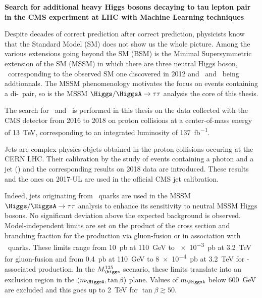 \begin{center}
\LARGE
\bf
\sffamily
Search for additional heavy Higgs bosons decaying to tau lepton pair in the CMS experiment at LHC with Machine Learning techniques
\end{center}

\vspace{2\baselineskip}

Despite decades of correct prediction after correct prediction,
physicists know that the Standard Model (SM) does not show us the whole picture.
Among the various extensions going beyond the SM (BSM)
is the
Minimal Supersymmetric extension of the SM (MSSM)
in which
there are three neutral Higgs boson,
\higgs\ corresponding to the observed SM one discovered in 2012
and
\Higgs\ and \HiggsA\ being addtionnals.
The MSSM phenomenology motivates the focus on events containing a di-\tau\ pair,
so is the MSSM $\Higgs/\HiggsA\to\tau\tau$ analysis the core of this thesis.
\par
The search
for \Higgs\ and \HiggsA\ 
is performed
in this thesis
on the data collected
with the CMS detector from 2016 to 2018
on proton collisions
at a center-of-mass energy of \SI{13}{\TeV},
corresponding to an integrated luminosity of \SI{137}{\femto\barn^{-1}}.
\par
Jets are complex physics objets
obtained
in the proton collisions occuring at the CERN LHC.
Their calibration by
the study of events containing a photon and a jet (\Gjet)
and the corresponding results on 2018 data
are introduced.
These results and the ones on 2017-UL
are used in the official CMS jet calibration.
\par
Indeed,
jets originating from \quarkb~quarks are used in the MSSM $\Higgs/\HiggsA\to\tau\tau$ analysis
to enhance its sensitivity to neutral MSSM Higgs bosons.
No significant deviation above the expected background is observed.
Model-independent limits are set
on the product of the cross section and branching fraction
for the production
via gluon-fusion
or
in association with \quarkb~quarks.
These limits range
from
\SI{10}{\pico\barn} at \SI{110}{\GeV}
to
\SI{e-3}{\pico\barn} at \SI{3.2}{\TeV}
for gluon-fusion
and from
\SI{0.4}{\pico\barn} at \SI{110}{\GeV}
to
\SI{8e-4}{\pico\barn} at \SI{3.2}{\TeV}
for \quarkb-associated production.
In the $M_{\higgs}^{125}$ scenario,
these limits translate into
an exclusion region in the $(m_{\HiggsA},\tan\beta)$ plane.
Values of $m_{\HiggsA}$ below \SI{600}{\GeV} are excluded
and this goes up to 
\SI{2}{\TeV} for $\tan\beta\gtrsim\num{50}$.
